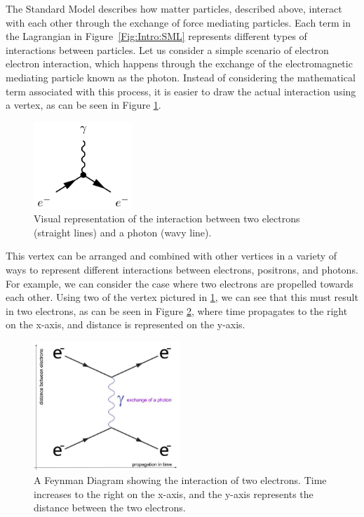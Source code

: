 The Standard Model describes how matter particles, described above, interact with each other through the exchange of force mediating particles. Each term in the Lagrangian in Figure~\ref{Fig:Intro:SML} represents different types of interactions between particles. Let us consider a simple scenario of electron electron interaction, which happens through the exchange of the electromagnetic mediating particle known as the photon. Instead of considering the mathematical term associated with this process, it is easier to draw the actual interaction using a vertex, as can be seen in Figure \ref{Fig:Intro:Vertex1}. 
\begin{figure}[h]
    \centering
        \includegraphics[width=0.33\textwidth]{F1/Vertex1}
        \caption{Visual representation of the interaction between two electrons (straight lines) and a photon (wavy line).}
        \label{Fig:Intro:Vertex1}
\end{figure}
This vertex can be arranged and combined with other vertices in a variety of ways to represent different interactions between electrons, positrons, and photons. For example, we can consider the case where two electrons are propelled towards each other. Using two of the vertex pictured in \ref{Fig:Intro:Vertex1}, we can see that this must result in two electrons, as can be seen in Figure \ref{Fig:Intro:Feynman1}, where time propagates to the right on the x-axis, and distance is represented on the y-axis. 
\begin{figure}[h]
    \centering
        \includegraphics[width=0.49\textwidth]{F1/FeynDiag1}
        \caption{A Feynman Diagram showing the interaction of two electrons. Time increases to the right on the x-axis, and the y-axis represents the distance between the two electrons.}
        \label{Fig:Intro:Feynman1}
\end{figure}
